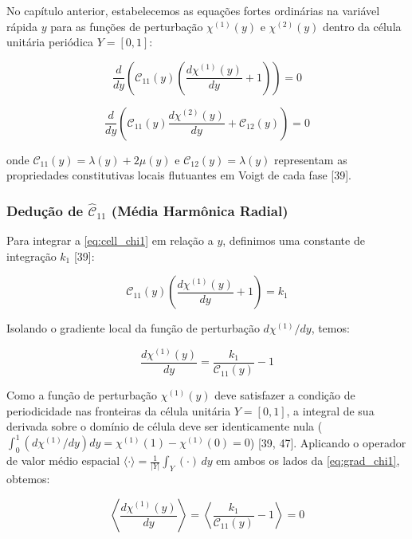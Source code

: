 No capítulo anterior, estabelecemos as equações fortes ordinárias na variável rápida $y$ para as funções de perturbação $\chi^{(1)}(y)$ e $\chi^{(2)}(y)$ dentro da célula unitária periódica $Y = [0, 1]$:

\begin{equation}
  \frac{d}{d y} \left( \mathcal{C}_{11}(y) \left( \frac{d \chi^{(1)}(y)}{d y} + 1 \right) \right) = 0
  \label{eq:cell_chi1}
\end{equation}

\begin{equation}
  \frac{d}{d y} \left( \mathcal{C}_{11}(y) \frac{d \chi^{(2)}(y)}{d y} + \mathcal{C}_{12}(y) \right) = 0
  \label{eq:cell_chi2}
\end{equation}

onde $\mathcal{C}_{11}(y) = \lambda(y) + 2 \mu(y)$ e $\mathcal{C}_{12}(y) = \lambda(y)$ representam as propriedades constitutivas locais flutuantes em Voigt de cada fase [39].

\subsubsection{Dedução de $\hat{\mathcal{C}}_{11}$ (Média Harmônica Radial)}

Para integrar a \eqref{eq:cell_chi1} em relação a $y$, definimos uma constante de integração $k_1$ [39]:

\begin{equation}
  \mathcal{C}_{11}(y) \left( \frac{d \chi^{(1)}(y)}{d y} + 1 \right) = k_1
  \label{eq:integ_chi1_1}
\end{equation}

Isolando o gradiente local da função de perturbação $d \chi^{(1)} / d y$, temos:

\begin{equation}
  \frac{d \chi^{(1)}(y)}{d y} = \frac{k_1}{\mathcal{C}_{11}(y)} - 1
  \label{eq:grad_chi1}
\end{equation}

Como a função de perturbação $\chi^{(1)}(y)$ deve satisfazer a condição de periodicidade nas fronteiras da célula unitária $Y = [0, 1]$, a integral de sua derivada sobre o domínio de célula deve ser identicamente nula ($\int_0^1 (d \chi^{(1)} / d y) d y = \chi^{(1)}(1) - \chi^{(1)}(0) = 0$) [39, 47]. Aplicando o operador de valor médio espacial $\langle \cdot \rangle = \frac{1}{|Y|} \int_Y (\cdot) \, d y$ em ambos os lados da \eqref{eq:grad_chi1}, obtemos:

\begin{equation}
  \left\langle \frac{d \chi^{(1)}(y)}{d y} \right\rangle = \left\langle \frac{k_1}{\mathcal{C}_{11}(y)} - 1 \right\rangle = 0
  \label{eq:mean_grad_chi1}
\end{equation}

